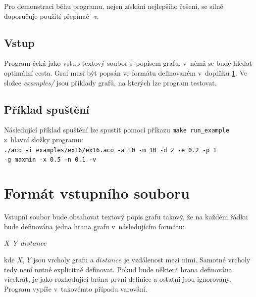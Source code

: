 \documentclass[a4paper, 12pt]{article}
\begin{document}
Pro demonstraci běhu programu, nejen získání nejlepšího řešení, se silně doporučuje použití přepínač \emph{-v}.

\subsection{Vstup}
Program čeká jako vstup textový soubor s~popisem grafu, v~němž se bude hledat optimální cesta. Graf musí být popsán ve formátu definovaném 
v~doplňku \ref{app:format}. Ve složce \emph{examples/} jsou příklady grafů, na kterých lze program testovat.

\subsection{Příklad spuštění}
Následující příklad spuštění lze spustit pomocí příkazu \texttt{make run\_example} z~hlavní složky programu:\\
\texttt{./aco -i examples/ex16/ex16.aco -a 10 -m 10 -d 2 -e 0.2 -p 1\\ -g maxmin -x 0.5 -n 0.1 -v}

\section{Formát vstupního souboru}
\label{app:format}
Vstupní soubor bude obsahovat textový popis grafu takový, že na každém řádku bude definována jedna hrana grafu v~následujícím formátu:
\begin{center}
  \texttt{$X$ $Y$ $distance$}
\end{center}
kde $X$, $Y$ jsou vrcholy grafu a $distance$ je vzdálenost mezi nimi. Samotné vrcholy tedy není nutné explicitně definovat. Pokud bude některá hrana
definována vícekrát, je jako rozhodující brána první definice a ostatní jsou ignorovány. Program vypíše v~takovémto případu varování.

\newpage


\end{document}
